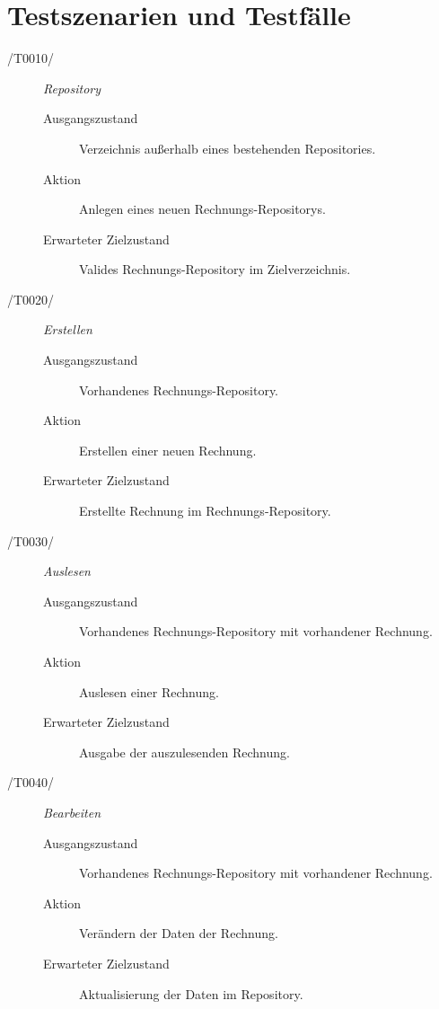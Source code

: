 
\section{Testszenarien und Testfälle}



\begin{description}
  \item[/T0010/]
	\textit{Repository}
	\begin{description}
		\item[Ausgangszustand]
		Verzeichnis außerhalb eines bestehenden Repositories.
		\item[Aktion]
		Anlegen eines neuen Rechnungs-Repositorys.
		\item[Erwarteter Zielzustand]
		Valides Rechnungs-Repository im Zielverzeichnis.
	\end{description}

  \item[/T0020/]
	\textit{Erstellen}
	\begin{description}
		\item[Ausgangszustand]
		Vorhandenes Rechnungs-Repository.
		\item[Aktion]
		Erstellen einer neuen Rechnung.
		\item[Erwarteter Zielzustand]
		Erstellte Rechnung im Rechnungs-Repository.
	\end{description}

  \item[/T0030/]
	\textit{Auslesen}
	\begin{description}
		\item[Ausgangszustand]
		Vorhandenes Rechnungs-Repository mit vorhandener Rechnung.
		\item[Aktion]
		Auslesen einer Rechnung.
		\item[Erwarteter Zielzustand]
		Ausgabe der auszulesenden Rechnung.
	\end{description}

  \item[/T0040/]
	\textit{Bearbeiten}
	\begin{description}
		\item[Ausgangszustand]
		Vorhandenes Rechnungs-Repository mit vorhandener Rechnung.
		\item[Aktion]
		Verändern der Daten der Rechnung.
		\item[Erwarteter Zielzustand]
		Aktualisierung der Daten im Repository.
	\end{description}


\end{description}

